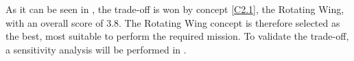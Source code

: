 As it can be seen in , the trade-off is won by concept \ref{C2.1}, the Rotating Wing, with an overall score of 3.8.
The Rotating Wing concept is therefore selected as the best, most suitable to perform the required mission.
To validate the trade-off, a sensitivity analysis will be performed in .


